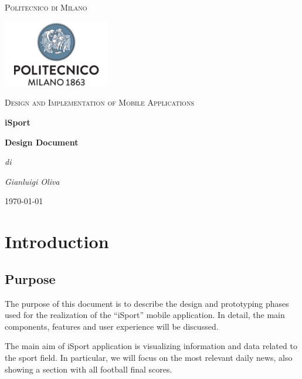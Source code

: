 \documentclass[numbers=noenddot, 12pt, a4paper, oneside]{scrbook}
\begin{document}
\begin{titlepage}
	\centering
	{\scshape\LARGE Politecnico di Milano \par}
	\vspace{1cm}
	\includegraphics[width=0.35\textwidth]{polimi-logo}\par
	\vspace{1cm}

	{\scshape\Large Design and Implementation of Mobile Applications\par}
	\vspace{1.5cm}
	{\huge\bfseries iSport \par}
	\vspace{1cm}
	{\Large\bfseries Design Document \par}
	\vspace{3cm}
	{\Large\itshape di\par}
	{\Large\itshape Gianluigi Oliva\par}
	\vspace{1.5cm}
	\vfill
	


	\vfill

	{\large \today\par}
\end{titlepage}

\newpage
\tableofcontents
\newpage


\chapter{Introduction}

\section{Purpose}
The purpose of this document is to describe the design and prototyping phases used for the realization of the “iSport” mobile application. In detail, the main components, features and user experience will be discussed.

The main aim of iSport application is visualizing information and data related to the sport field. In particular, we will focus on the most relevant daily news, also showing a section with all football final scores.
\end{document}
